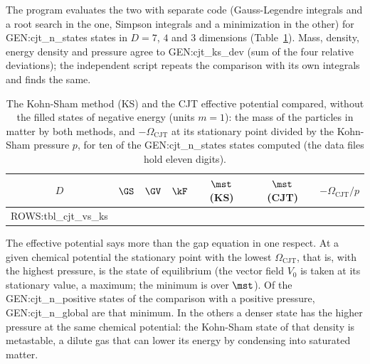 The program evaluates the two with separate code (Gauss-Legendre integrals and a root search in the
one, Simpson integrals and a minimization in the other) for {{GEN:cjt_n_states}} states in $D=7$,
$4$ and $3$ dimensions (Table~\ref{tab:cjtks}). Mass, density, energy density and pressure agree to
{{GEN:cjt_ks_dev}} (sum of the four relative deviations); the independent script repeats the
comparison with its own integrals and finds the same.

\begin{table}
\caption{\label{tab:cjtks}The Kohn-Sham method (KS) and the CJT effective potential compared, without
the filled states of negative energy (units $m=1$): the mass of the particles in matter by both
methods, and $-\Omega_{\mathrm{CJT}}$ at its stationary point divided by the Kohn-Sham pressure $p$,
for ten of the {{GEN:cjt_n_states}} states computed (the data files hold eleven digits).}
\begin{ruledtabular}
\begin{tabular}{ccccccc}
$D$ & $\GS$ & $\GV$ & $\kF$ & $\mst$ (KS) & $\mst$ (CJT) & $-\Omega_{\mathrm{CJT}}/p$ \\
\hline
{{ROWS:tbl_cjt_vs_ks}}
\end{tabular}
\end{ruledtabular}
\end{table}

The effective potential says more than the gap equation in one respect. At a given chemical
potential the stationary point with the lowest $\Omega_{\mathrm{CJT}}$, that is, with the highest
pressure, is the state of equilibrium (the vector field $V_0$ is taken at its stationary value, a
maximum; the minimum is over $\mst$). Of the {{GEN:cjt_n_positive}} states of the comparison with a
positive pressure, {{GEN:cjt_n_global}} are that minimum. In the others a denser state has the higher
pressure at the same chemical potential: the Kohn-Sham state of that density is metastable, a dilute
gas that can lower its energy by condensing into saturated matter.

